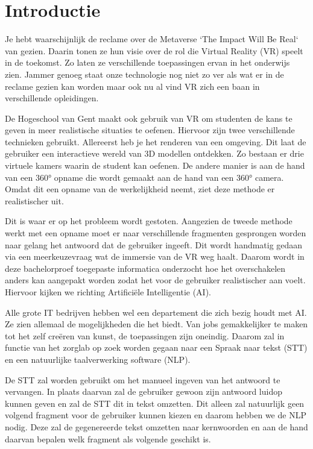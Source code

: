 
\section{Introductie}%
\label{sec:introductie}

Je hebt waarschijnlijk de reclame over de Metaverse `The Impact Will Be Real` van \textcite{Meta2022} gezien. Daarin tonen ze hun visie over de rol die Virtual Reality (VR) speelt in de toekomst. Zo laten ze verschillende toepassingen ervan in het onderwijs zien. Jammer genoeg staat onze technologie nog niet zo ver als wat er in de reclame gezien kan worden maar ook nu al vind VR zich een baan in verschillende opleidingen.

De Hogeschool van Gent maakt ook gebruik van VR om studenten de kans te geven in meer realistische situaties te oefenen. Hiervoor zijn twee verschillende technieken gebruikt. Allereerst heb je het renderen van een omgeving. Dit laat de gebruiker een interactieve wereld van 3D modellen ontdekken. Zo bestaan er drie virtuele kamers waarin de student kan oefenen. De andere manier is aan de hand van een 360° opname die wordt gemaakt aan de hand van een 360° camera. Omdat dit een opname van de werkelijkheid neemt, ziet deze methode er realistischer uit.

Dit is waar er op het probleem wordt gestoten. Aangezien de tweede methode werkt met een opname moet er naar verschillende fragmenten gesprongen worden naar gelang het antwoord dat de gebruiker ingeeft. Dit wordt handmatig gedaan via een meerkeuzevraag wat de immersie van de VR weg haalt. Daarom wordt in deze bachelorproef toegepaste informatica onderzocht hoe het overschakelen anders kan aangepakt worden zodat het voor de gebruiker realistischer aan voelt. Hiervoor kijken we richting Artificiële Intelligentie (AI).

Alle grote IT bedrijven hebben wel een departement die zich bezig houdt met AI. Ze zien allemaal de mogelijkheden die het biedt. Van jobs gemakkelijker te maken tot het zelf creëren van kunst, de toepassingen zijn oneindig. Daarom zal in functie van het zorglab op zoek worden gegaan naar een Spraak naar tekst (STT) en een natuurlijke taalverwerking software (NLP).

De STT zal worden gebruikt om het manueel ingeven van het antwoord te vervangen. In plaats daarvan zal de gebruiker gewoon zijn antwoord luidop kunnen geven en zal de STT dit in tekst omzetten. Dit alleen zal natuurlijk geen volgend fragment voor de gebruiker kunnen kiezen en daarom hebben we de NLP nodig. Deze zal de gegenereerde tekst omzetten naar kernwoorden en aan de hand daarvan bepalen welk fragment als volgende geschikt is.




